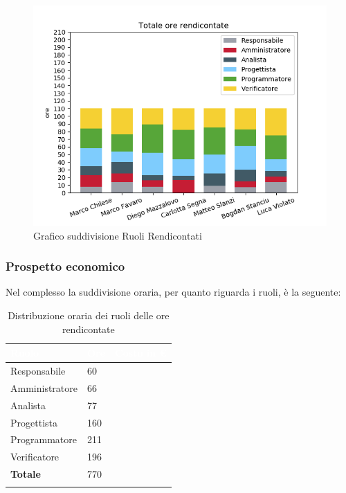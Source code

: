 \begin{figure}[H]
	\centering
  		\includegraphics[width=1\linewidth]{./images/fig_tor.png}
  		\caption{Grafico suddivisione Ruoli Rendicontati}
  		\label{fig:grafico suddivione ruoli}
\end{figure}


\subsubsection{Prospetto economico}
Nel complesso la suddivisione oraria, per quanto riguarda i ruoli, è la seguente: 


\begin{longtable}{| C{.30\textwidth}| C{.15\textwidth}| C{.20\textwidth}|}
\hline
{}\textbf{\textcolor{white}{Ruolo}} & \textbf{\textcolor{white}{Ore}} & \textbf{\textcolor{white}{Costo in \euro}} \\
\hline
Responsabile & 60 &  \\
\hline
{}Amministratore & 66 &  \\
\hline
Analista & 77 &  \\
\hline
{}Progettista & 160 & \\
\hline 
Programmatore & 211 &  \\
\hline
{}Verificatore & 196 &  \\
\hline 
\textbf{Totale} & 770 & \\
\hline

\caption{Distribuzione oraria dei ruoli delle ore rendicontate}
\label{Distribuzione oraria a carico del committente}
\end{longtable}

